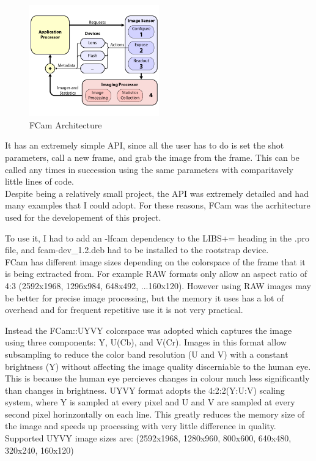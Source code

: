 \documentclass[11pt]{article} %
\begin{document}
\begin{figure}
	\vspace{-40pt}
	\begin{center}
		\includegraphics[width=0.5\textwidth]{../images/fcam_arch}
	\end{center}
	\vspace{-20pt}
	\caption{FCam Architecture}
\end{figure}
It has an extremely simple API, since all the user has to do is set the shot parameters, call a new frame, and grab the image from the frame. This can be called any times in succession using the same parameters with comparitavely little lines of code.\\
Despite being a relatively small project, the API was extremely detailed and had many examples that I could adopt. For these reasons, FCam was the acrhitecture used for the developement of this project.

To use it, I had to add an -lfcam dependency to the LIBS+= heading in the .pro file, and fcam-dev\_1.2.deb had to be installed to the rootstrap device.\\

FCam has different image sizes depending on the colorspace of the frame that it is being extracted from. For example RAW formats only allow an aspect ratio of 4:3 (2592x1968, 1296x984, 648x492, ...160x120). However using RAW images may be better for precise image processing, but the memory it uses has a lot of overhead and for frequent repetitive use it is not very practical.

Instead the FCam::UYVY colorspace was adopted which captures the image using three components: Y, U(Cb), and V(Cr). 
Images in this format allow subsampling to reduce the color band resolution (U and V) with a constant brightness (Y) without affecting the image quality discerniable to the human eye. This is because the human eye percieves changes in colour much less significantly than changes in brightness. UYVY format adopts the 4:2:2(Y:U:V) scaling system, where Y is sampled at every pixel and U and V are sampled at every second pixel horinzontally on each line. This greatly reduces the memory size of the image and speeds up processing with very little difference in quality.\\
Supported UYVY image sizes are: (2592x1968, 1280x960, 800x600, 640x480, 320x240, 160x120)
\end{document}
